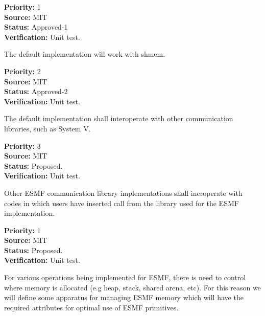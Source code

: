 \begin{reqlist}
{\bf Priority:} 1 \\
{\bf Source:}  MIT \\
{\bf Status:} Approved-1 \\
{\bf Verification:} Unit test. \\ 
\end{reqlist}

The default implementation will work with shmem.

\begin{reqlist}
{\bf Priority:} 2 \\
{\bf Source:}  MIT \\
{\bf Status:} Approved-2 \\
{\bf Verification:} Unit test. \\ 
\end{reqlist}

The default implementation shall interoperate with other communication
libraries, such as System V.

\begin{reqlist}
{\bf Priority:} 3 \\
{\bf Source:}  MIT \\
{\bf Status:} Proposed. \\
{\bf Verification:} Unit test. \\ 
\end{reqlist}

Other ESMF communication library implementations shall ineroperate with codes
in which users have inserted call from the library used for the ESMF implementation.

\begin{reqlist}
{\bf Priority:} 1 \\
{\bf Source:}  MIT \\
{\bf Status:} Proposed. \\
{\bf Verification:} Unit test. \\ 
\end{reqlist}


For various operations being implemented for ESMF, there is need to
control where memory is allocated (e.g heap, stack, shared arena,
etc). For this reason we will define some apparatus for managing
ESMF memory which will have the required attributes for optimal
use of ESMF primitives.  


